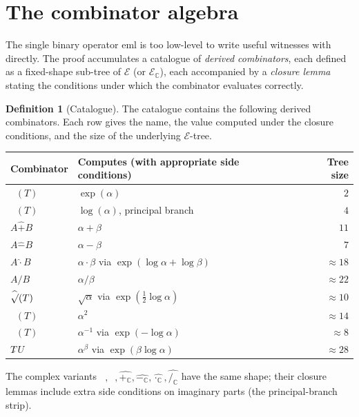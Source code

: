 \documentclass[11pt]{article}
\newcommand{\hexp}{\mathop{\widehat{\exp}}}
\newcommand{\hlog}{\mathop{\widehat{\log}}}
\newcommand{\hsqrt}{\mathop{\widehat{\sqrt{\vphantom{x}}}}}
\newcommand{\hsq}{\mathop{\widehat{\mathrm{sq}}}}
\newcommand{\hinv}{\mathop{\widehat{\mathrm{inv}}}}
\newcommand{\hadd}{\mathbin{\widehat{+}}}
\newcommand{\hsub}{\mathbin{\widehat{-}}}
\newcommand{\hmul}{\mathbin{\widehat{\cdot}}}
\newcommand{\hdiv}{\mathbin{\widehat{/}}}
\newcommand{\hpow}{\mathbin{\widehat{\hat{}}\,}}
\newcommand{\hexpC}{\mathop{\widehat{\exp_{\!\mathbb{C}}}}}
\newcommand{\hlogC}{\mathop{\widehat{\log_{\!\mathbb{C}}}}}
\newcommand{\haddC}{\mathbin{\widehat{+_{\!\mathbb{C}}}}}
\newcommand{\hsubC}{\mathbin{\widehat{-_{\!\mathbb{C}}}}}
\newcommand{\hmulC}{\mathbin{\widehat{\cdot_{\!\mathbb{C}}}}}
\newcommand{\hdivC}{\mathbin{\widehat{/_{\!\mathbb{C}}}}}
\newcommand{\Eset}{\mathcal{E}}
\newcommand{\EsetC}{\mathcal{E}_{\mathbb{C}}}
\theoremstyle{plain}
\theoremstyle{definition}
\newtheorem{definition}[theorem]{Definition}
\begin{document}
\section{The combinator algebra}
\label{sec:combinators}

The single binary operator $\mathrm{eml}$ is too low-level to write
useful witnesses with directly. The proof accumulates a catalogue of
\emph{derived combinators}, each defined as a fixed-shape sub-tree of
$\Eset$ (or $\EsetC$), each accompanied by a \emph{closure lemma}
stating the conditions under which the combinator evaluates correctly.

\begin{definition}[Catalogue]
\label{def:catalogue}
The catalogue contains the following derived combinators. Each row
gives the name, the value computed under the closure conditions, and
the size of the underlying $\Eset$-tree.

\smallskip
\begin{center}
\begin{tabular}{l l r}
\toprule
\textbf{Combinator} & \textbf{Computes (with appropriate side conditions)} & \textbf{Tree size} \\
\midrule
$\hexp(T)$       & $\exp(\alpha)$ & $2$ \\
$\hlog(T)$       & $\log(\alpha)$, principal branch & $4$ \\
$A \hadd B$      & $\alpha + \beta$ & $11$ \\
$A \hsub B$      & $\alpha - \beta$ & $7$ \\
$A \hmul B$      & $\alpha \cdot \beta$ via $\exp(\log\alpha + \log\beta)$ & $\approx 18$ \\
$A \hdiv B$      & $\alpha / \beta$ & $\approx 22$ \\
$\hsqrt(T)$      & $\sqrt{\alpha}$ via $\exp(\tfrac{1}{2}\log\alpha)$ & $\approx 10$ \\
$\hsq(T)$        & $\alpha^{2}$ & $\approx 14$ \\
$\hinv(T)$       & $\alpha^{-1}$ via $\exp(-\log\alpha)$ & $\approx 8$ \\
$T \hpow U$      & $\alpha^{\beta}$ via $\exp(\beta \log\alpha)$ & $\approx 28$ \\
\bottomrule
\end{tabular}
\end{center}
\smallskip

The complex variants $\hexpC,\hlogC,\haddC,\hsubC,\hmulC,\hdivC$ have
the same shape; their closure lemmas include extra side conditions on
imaginary parts (the principal-branch strip).
\end{definition}
\end{document}
